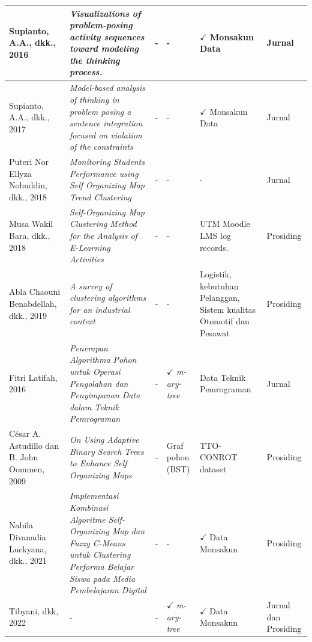 \begin{landscape}
\begin{center}
\begin{tabularx}{\linewidth}{|Y|Y|c|Y|Y|Y|}
			Supianto, A.A., dkk., 2016 & \textit{Visualizations of problem-posing activity sequences toward modeling the thinking process.}
			& - & - & $\checkmark$ Monsakun Data & Jurnal \\ \hline
			
			Supianto, A.A., dkk., 2017 & \textit{Model-based analysis of thinking in problem posing a sentence integration focused on violation of the constraints}
			& - & - & $\checkmark$ Monsakun Data & Jurnal \\ \hline
			
			Puteri Nor Ellyza Nohuddin, dkk., 2018 & \textit{Monitoring Students Performance using Self Organizing Map Trend Clustering}
			& - & - & - & Jurnal \\ \hline
			
			Musa Wakil Bara, dkk., 2018 & \textit{Self-Organizing Map Clustering Method for the Analysis of E-Learning Activities}
			& - & - & UTM Moodle LMS log records. & Prosiding \\ \hline
			
			Abla Chaouni Benabdellah, dkk., 2019 & \textit{A survey of clustering algorithms for an industrial context}
			& - & - & Logistik, kebutuhan Pelanggan, Sistem kualitas Otomotif dan Pesawat & Prosiding \\ \hline
			
			Fitri Latifah, 2016 & \textit{Penerapan Algorithma Pohon untuk Operasi Pengolahan dan Penyimpanan Data dalam Teknik Pemrograman}
			& - & $\checkmark$ \textit{m-ary-tree} & Data Teknik Pemrograman & Jurnal \\ \hline
			
			César A. Astudillo dan B. John Oommen, 2009 & \textit{On Using Adaptive Binary Search Trees to Enhance Self Organizing Maps}
			& - & Graf pohon (BST) & TTO-CONROT dataset & Prosiding \\ \hline
			
			Nabila Divanadia Luckyana, dkk., 2021 & \textit{Implementasi Kombinasi Algoritme Self-Organizing Map dan Fuzzy C-Means untuk Clustering Performa Belajar Siswa pada Media Pembelajaran Digital}
			& - & - & $\checkmark$ Data Monsakun & Prosiding \\ \hline
			
			Tibyani, dkk, 2022 & - & - & $\checkmark$ \textit{m-ary-tree} & $\checkmark$ Data Monsakun & Jurnal dan Prosiding \\ \hline
			
		\end{tabularx}
	\end{center}
\end{landscape}


